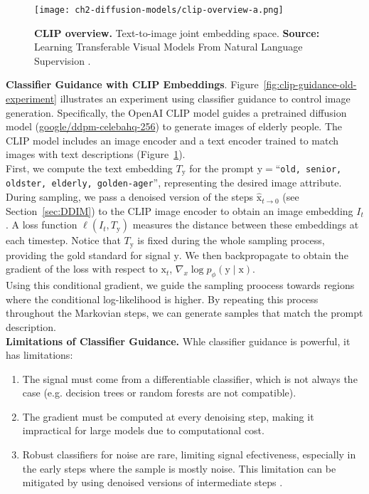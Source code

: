 \begin{figure}[ht]
    \centering
    \texttt{[image: ch2-diffusion-models/clip-overview-a.png]}
    \captionsetup{width=\textwidth} %
    \caption{\textbf{CLIP overview.} Text-to-image joint embedding space. \textbf{Source:} Learning Transferable Visual Models From Natural Language Supervision \citep{radford2021learning}.}
    \label{fig:clip-overview}
  \end{figure}

\noindent \textbf{Classifier Guidance with CLIP Embeddings}. Figure~\ref{fig:clip-guidance-old-experiment} illustrates an experiment using classifier guidance to control image generation. Specifically, the OpenAI CLIP model \cite{radford2021learning} guides a pretrained diffusion model (\href{https://huggingface.co/google/ddpm-celebahq-256}{google/ddpm-celebahq-256}) to generate
images of elderly people. The CLIP model includes an image encoder and a text encoder trained to match images with text descriptions (Figure~\ref{fig:clip-overview}). \\ 

\noindent First, we compute the text embedding $T_{\mathrm{y}}$ for the prompt $\mathrm{y}=$``\texttt{old, senior, oldster, elderly, golden-ager}'',  representing the desired image attribute. During sampling, we pass a denoised version of the steps $\hat{\mathrm{x}}_{t\rightarrow 0}$ (see Section~\ref{sec:DDIM}) to the CLIP image encoder to obtain an image embedding $I_{t}$. A loss function $\ell(I_{t}, T_{\mathrm{y}})$ measures the distance between these
embeddings at each timestep. Notice that $T_{\mathrm{y}}$ is fixed during the
whole sampling process, providing the gold standard for signal $\mathrm{y}$. We then backpropagate to obtain the gradient of the loss with respect to $\mathrm{x}_{t}$, $\nabla_{x}\log p_{\phi}(\mathrm{y}\mid \mathrm{x})$. \\

\noindent Using this conditional gradient, we guide the sampling proocess towards regions where the conditional log-likelihood is higher. By repeating this process throughout the Markovian steps, we can generate samples that match the prompt 
description. \\

\noindent \textbf{Limitations of Classifier Guidance.} Whle classifier guidance is powerful, it has limitations:

\begin{enumerate}
    \item The signal must come from a differentiable classifier, which is not always the case (e.g. decision trees or random forests are not compatible).
    \item The gradient must be computed at every denoising step, making it impractical for large models due to computational cost.
    \item Robust classifiers for noise are rare, limiting signal efectiveness, especially in the early steps where the sample is mostly noise. This limitation can be mitigated by using denoised versions of intermediate steps \cite{bansal2023universal}.
\end{enumerate}

